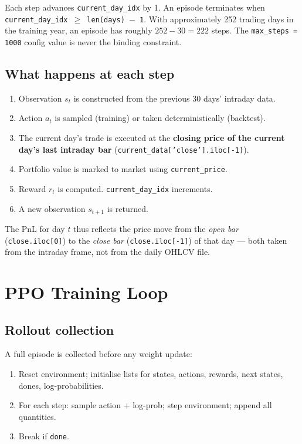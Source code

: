 \documentclass[11pt,a4paper]{article}
\begin{document}
Each step advances \texttt{current\_day\_idx} by 1. An episode terminates when \texttt{current\_day\_idx $\geq$ len(days) $-$ 1}. With approximately 252 trading days in the training year, an episode has roughly $252 - 30 = 222$ steps. The \texttt{max\_steps = 1000} config value is never the binding constraint.

\subsection{What happens at each step}

\begin{enumerate}
  \item Observation $s_t$ is constructed from the previous 30 days' intraday data.
  \item Action $a_t$ is sampled (training) or taken deterministically (backtest).
  \item The current day's trade is executed at the \textbf{closing price of the current day's last intraday bar} (\texttt{current\_data['close'].iloc[-1]}).
  \item Portfolio value is marked to market using \texttt{current\_price}.
  \item Reward $r_t$ is computed. \texttt{current\_day\_idx} increments.
  \item A new observation $s_{t+1}$ is returned.
\end{enumerate}

The PnL for day $t$ thus reflects the price move from the \emph{open bar} (\texttt{close.iloc[0]}) to the \emph{close bar} (\texttt{close.iloc[-1]}) of that day --- both taken from the intraday frame, not from the daily OHLCV file.

\section{PPO Training Loop}

\subsection{Rollout collection}

A full episode is collected before any weight update:

\begin{enumerate}
  \item Reset environment; initialise lists for states, actions, rewards, next states, dones, log-probabilities.
  \item For each step: sample action + log-prob; step environment; append all quantities.
  \item Break if \texttt{done}.
\end{enumerate}
\end{document}

